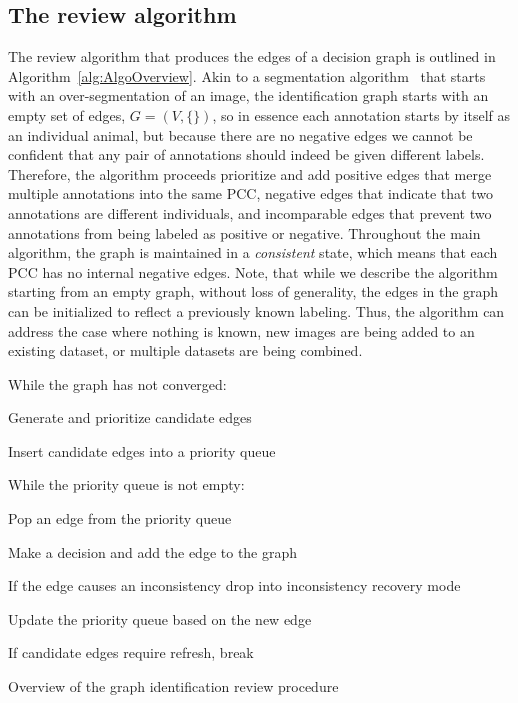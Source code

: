 

\FloatBarrier{}
\subsection{The review algorithm}\label{sub:graphalgo}


The review algorithm that produces the edges of a decision graph is outlined in Algorithm~\ref{alg:AlgoOverview}.
Akin to a segmentation algorithm~\cite{fulkerson_class_2009} that starts with an over-segmentation of an image,
  the identification graph starts with an empty set of edges, $G = (V, \{ \})$, so in essence each annotation
  starts by itself as an individual animal, but because there are no negative edges we cannot be confident that any
  pair of annotations should indeed be given different labels.
Therefore, the algorithm proceeds prioritize and add positive edges that merge multiple annotations into the same
  PCC, negative edges that indicate that two annotations are different individuals, and incomparable edges that
  prevent two annotations from being labeled as positive or negative.
Throughout the main algorithm, the graph is maintained in a \emph{consistent} state, which means that each PCC
  has no internal negative edges.
Note, that while we describe the algorithm starting from an empty graph, without loss of generality, the edges in
  the graph can be initialized to reflect a previously known labeling.
Thus, the algorithm can address the case where nothing is known, new images are being added to an existing
  dataset, or multiple datasets are being combined.


\begin{algorithm}
        While the graph has not converged:
        \begin{enumln}
            \item Generate and prioritize candidate edges 
            \item Insert candidate edges into a priority queue 
            \item While the priority queue is not empty:
            \begin{enumln}
                \item Pop an edge from the priority queue
                \item Make a decision and add the edge to the graph
                \item If the edge causes an inconsistency drop into inconsistency recovery mode
                \item Update the priority queue based on the new edge
                \item If candidate edges require refresh, break
            \end{enumln}
        \end{enumln}
\caption[Algorithm Overview]{Overview of the graph identification review procedure}
\label{alg:AlgoOverview}
\end{algorithm}

